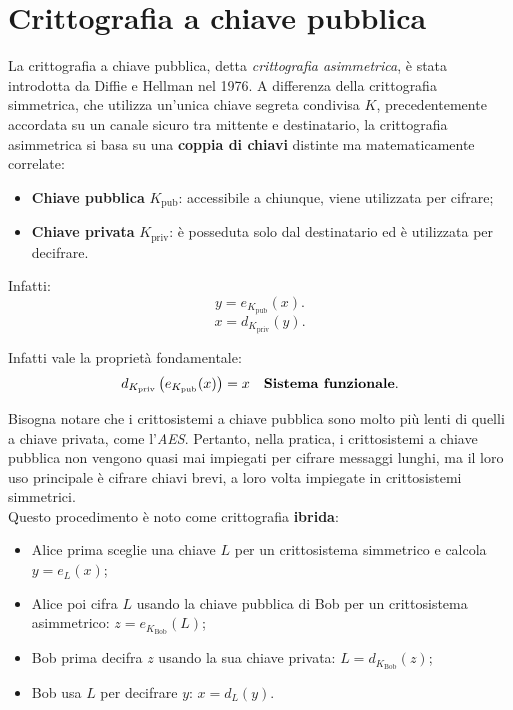 \section{Crittografia a chiave pubblica}

La crittografia a chiave pubblica, detta \textit{crittografia asimmetrica}, è stata introdotta da Diffie e Hellman nel 1976. A differenza della crittografia simmetrica, che utilizza un'unica chiave segreta condivisa $K$, precedentemente accordata su un canale sicuro tra mittente e destinatario, la crittografia asimmetrica si basa su una \textbf{coppia di chiavi} distinte ma matematicamente correlate:
\begin{itemize}
    \item \textbf{Chiave pubblica} $K_{\mathrm{pub}}$: accessibile a chiunque, viene utilizzata per cifrare;
    \item \textbf{Chiave privata} $K_{\mathrm{priv}}$: è posseduta solo dal destinatario ed è  utilizzata per decifrare. 
\end{itemize}

Infatti:
\[
    y=e_{K_{\mathrm{pub}}}(x).
\]
\[
    x=d_{K_{\mathrm{priv}}}(y).
\]


Infatti vale la proprietà fondamentale:
\[
    d_{K_{\mathrm{priv}}}
    \left(e_{K_{\mathrm{pub}}}(x)\right)=x \quad \text{\textbf{Sistema funzionale}}.
\]


\vspace{1em} Bisogna notare che i crittosistemi a chiave pubblica sono molto più lenti di quelli a chiave privata, come l'\textit{AES}. Pertanto, nella pratica, i crittosistemi a chiave pubblica non vengono quasi mai impiegati per cifrare messaggi lunghi, ma il loro uso principale è cifrare chiavi brevi, a loro volta impiegate in crittosistemi simmetrici.  \\ Questo procedimento è noto come crittografia \textbf{ibrida}:

\begin{itemize}
    \item Alice prima sceglie una chiave $L$ per un crittosistema simmetrico e calcola $y=e_L(x)$;
    \item Alice poi cifra $L$ usando la chiave pubblica di Bob per un crittosistema asimmetrico: $z=e_{K_{\text{Bob}}}(L)$;
    \item Bob prima decifra $z$ usando la sua chiave privata: $L=d_{K_{\text{Bob}}}(z)$;
    \item Bob usa $L$ per decifrare $y$: $x=d_L(y)$. 
\end{itemize}


